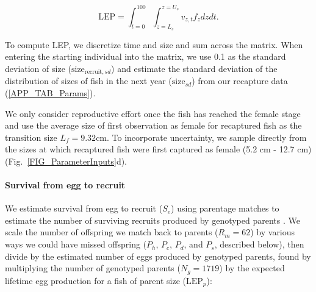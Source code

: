 \documentclass[12pt, oneside]{article}   	%
\begin{document}
\begin{equation}
\text{LEP} = \int_{t=0}^{100}\int_{z=L_s}^{z=U_s} v_{z,t} f_z dz dt. \label{EQN_LEP}
\end{equation}

To compute LEP, we discretize time and size and sum across the matrix. When entering the starting individual into the matrix, we use 0.1 as the standard deviation of size ($\text{size}_{\text{recruit}, sd}$) and estimate the standard deviation of the distribution of sizes of fish in the next year ($\text{size}_{sd}$) from our recapture data (\ref{APP_TAB_Params}). %

We only consider reproductive effort once the fish has reached the female stage and use the average size of first observation as female for recaptured fish as the transition size $L_f = 9.32 \text{cm}$. To incorporate uncertainty, we sample directly from the sizes at which recaptured fish were first captured as female (5.2 cm - 12.7 cm) (Fig.\ \ref{FIG_ParameterInputs}d).



\paragraph*{Survival from egg to recruit}

We estimate survival from egg to recruit ($S_e$) using parentage matches to estimate the number of surviving recruits produced by genotyped parents \citep[similar to the method in][]{johnson2018integrating}. We scale the number of offspring we match back to parents ($R_m = 62$) by various ways we could have missed offspring ($P_h$, $P_c$, $P_d$, and $P_s$, described below), then divide by the estimated number of eggs produced by genotyped parents, found by multiplying the number of genotyped parents ($N_g = 1719$) by the expected lifetime egg production for a fish of parent size ($\text{LEP}_p$):
\end{document}
